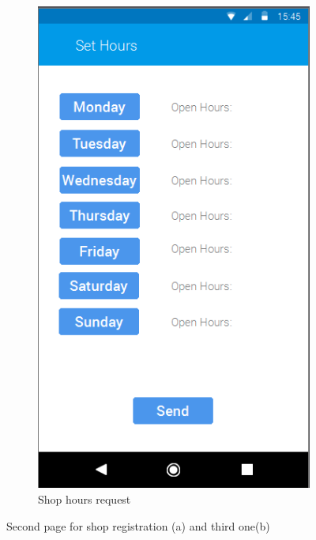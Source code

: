 \begin{figure}[h]
\begin{subfigure}{.5\textwidth}
  \includegraphics[height=.4\textheight, keepaspectratio=true]{Img/Mockup_RegistrationShop3}
  \caption{Shop hours request}
\end{subfigure}
\caption{Second page for shop registration (a) and third one(b)}
\end{figure}

